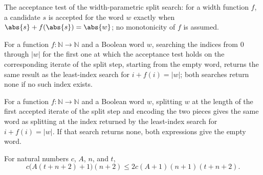 \begin{definition}
\label{Turing.FinTM.emitterSplitAccept}
\leanok
The acceptance test of the width-parametric split search: for a width
function $f$, a candidate $s$ is accepted for the word $w$ exactly when
$\abs{s} + f(\abs{s}) = \abs{w}$; no monotonicity of $f$ is assumed.
\end{definition}

\begin{lemma}
\label{Turing.FinTM.emitterSplit_find}
\leanok
{}
For a function $f:\mathbb{N}\to\mathbb{N}$ and a Boolean word $w$, searching the indices
from $0$ through $|w|$ for the first one at which the acceptance test holds on the
corresponding iterate of the split step, starting from the empty word, returns the same
result as the least-index search for $i+f(i)=|w|$; both searches return none if no such
index exists.
\end{lemma}

\begin{lemma}
\label{Turing.FinTM.emitterSplit_result}
\leanok
{}
For a function $f:\mathbb{N}\to\mathbb{N}$ and a Boolean word $w$, splitting $w$ at the
length of the first accepted iterate of the split step and encoding the two pieces gives
the same word as splitting at the index returned by the least-index search for
$i+f(i)=|w|$. If that search returns none, both expressions give the empty word.
\end{lemma}

\begin{lemma}
\label{Turing.FinTM.emitterSplit_loop_bound}
\leanok
{}
For natural numbers $c$, $A$, $n$, and $t$,
\[
c\bigl(A(t+n+2)+1\bigr)(n+2)\le 2c(A+1)(n+1)(t+n+2).
\]
\end{lemma}

